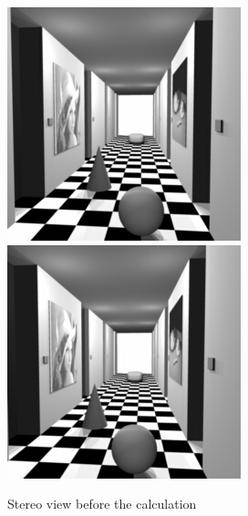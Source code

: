 \documentclass{article}
\begin{document}
	\begin{figure}[!h]
		\center
		\caption{Stereo view before the calculation}
		\includegraphics[scale=0.4]{corridorl.jpg}
		\includegraphics[scale=0.4]{corridorr.jpg}
	\end{figure}
	
\end{document}
